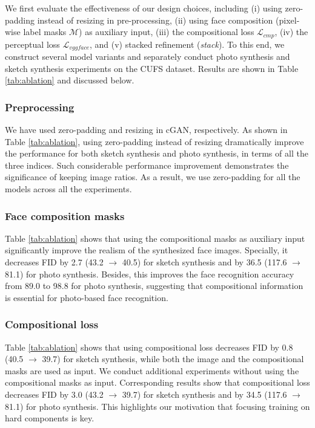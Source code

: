 \documentclass[journal]{IEEEtran}
\begin{document}
We first evaluate the effectiveness of our design choices, including (i) using zero-padding instead of resizing in pre-processing, (ii) using face composition (pixel-wise label masks $\mathcal{M}$) as auxiliary input, (iii) the compositional loss $\mathcal{L}_{cmp}$, (iv) the perceptual loss $\mathcal{L}_{vggface}$, and (v) stacked refinement (\textit{stack}). To this end, we construct several model variants and separately conduct photo synthesis and sketch synthesis experiments on the CUFS dataset. Results are shown in Table \ref{tab:ablation} and discussed below.

\subsubsection{Preprocessing} \label{ssec:ablation_preproc} We have used zero-padding and resizing in cGAN, respectively. As shown in Table \ref{tab:ablation}, using zero-padding instead of resizing dramatically improve the performance for both sketch synthesis and photo synthesis, in terms of all the three indices. Such considerable performance improvement demonstrates the significance of keeping image ratios. As a result, we use zero-padding for all the models across all the experiments. 

\subsubsection{Face composition masks} Table \ref{tab:ablation} shows that using the compositional masks as auxiliary input significantly improve the realism of the synthesized face images. Specially, it decreases FID by 2.7 (43.2 $\to$ 40.5) for sketch synthesis and by 36.5 (117.6  $\to$  81.1) for photo synthesis. Besides, this improves the face recognition accuracy from 89.0 to 98.8 for photo synthesis, suggesting that compositional information is essential for photo-based face recognition.

\subsubsection{Compositional loss} Table \ref{tab:ablation} shows that using compositional loss decreases FID by 0.8 (40.5 $\to$ 39.7) for sketch synthesis, while both the image and the compositional masks are used as input. We conduct additional experiments without using the compositional masks as input. Corresponding results show that compositional loss decreases FID by 3.0 (43.2 $\to$ 39.7) for sketch synthesis and by 34.5 (117.6 $\to$ 81.1) for photo synthesis. This highlights our motivation that focusing training on hard components is key. 
\end{document}
